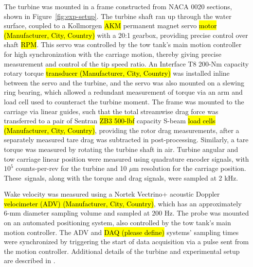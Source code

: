 \documentclass[energies,article,accept,moreauthors,pdftex,10pt,a4paper]{mdpi}
\theoremstyle{mdpi}
\newcounter{ex}
\newcounter{re}
\begin{document}
The turbine was mounted in a frame constructed from NACA 0020 sections, shown in
Figure~\ref{fig:exp-setup}. The turbine shaft ran up through the water surface,
coupled to a Kollmorgen \hl {AKM}
  permanent magnet servo \hl {motor (Manufacturer, City, Country)} with a 20:1 gearbox,
providing precise control over shaft \hl {RPM}. This servo was controlled by the tow
tank's main motion controller for high synchronization with the carriage motion,
thereby giving precise measurement and control of the tip speed ratio. An Interface
T8 200-Nm capacity rotary torque \hl {transducer (Manufacturer, City, Country)} was installed inline between the
servo and the turbine, and the servo was also mounted on a slewing ring bearing,
which allowed a redundant measurement of torque via an arm and load cell used to
counteract the turbine moment. The frame was mounted to the carriage via linear
guides, such that the total streamwise drag force was transferred to a pair of
Sentran \hl {ZB3 500-lbf} %
 capacity S-beam \hl {load cells (Manufacturer, City, Country)}, providing the rotor drag
measurements, after a separately measured tare drag was subtracted in post-processing. Similarly, a tare torque was measured by rotating the turbine shaft
in air. Turbine angular and tow carriage linear position were measured using
quadrature encoder signals, with $10^5$ counts-per-rev for the turbine and 10 ${\mu}$m resolution for the carriage position. These~signals, along with
the torque and drag signals, were sampled at 2 kHz.



Wake velocity was measured using a Nortek Vectrino+ acoustic Doppler \hl {velocimeter
(ADV)  (Manufacturer, City, Country)}, which has an approximately 6-mm diameter sampling volume and sampled at
200 Hz. The probe was mounted on an automated positioning system, also
controlled by the tow tank's main motion controller. The ADV and \hl {DAQ (please define)} systems'
sampling times were synchronized by triggering the start of data acquisition via
a pulse sent from the motion controller. Additional details of the turbine and
experimental setup are described in \cite{Bachant2015-JoT}.
\end{document}
